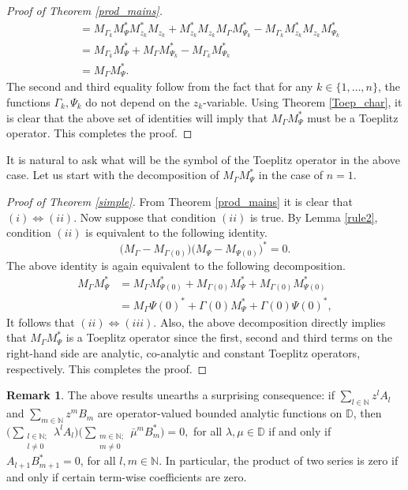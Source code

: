 \documentclass[12pt]{amsart}
\theoremstyle{definition}
\newtheorem{rem}{Remark}[section]
\newcommand{\Nat}{\mathbb{N}}
\newcommand{\D}{\mathbb{D}}
\newcommand{\1}{{\mbox{\bf 1}}}
\begin{document}
\begin{proof}[Proof of Theorem \ref{prod_mains}]
\begin{align*}
&= M_{\Gamma_k} M_{\Psi}^* M_{z_k}^* M_{z_k} + M_{z_k}^* M_{z_k} M_{\Gamma} M_{\Psi_k}^* - M_{\Gamma_k} M_{z_k}^* M_{z_k} M_{\Psi_k}^* \\
&= M_{\Gamma_k} M_{\Psi}^* + M_{\Gamma} M_{\Psi_k}^* - M_{\Gamma_k} M_{\Psi_k}^*\\
&= M_{\Gamma} M_{\Psi}^*.
\end{align*}
The second and third equality follow from the fact that for any $k \in \{1,\ldots,n\}$, the functions $\Gamma_k, \Psi_k$ do not depend on the $z_k$-variable. Using Theorem \ref{Toep_char}, it is clear that the above set of identities will imply that $M_{\Gamma} M_{\Psi}^*$ must be a Toeplitz operator. This completes the proof.
\end{proof}
It is natural to ask what will be the symbol of the Toeplitz operator in the above case.  Let us start with the decomposition of $M_{\Gamma}M_{\Psi}^*$ in the case of $n=1$.
\begin{proof}[Proof of Theorem \ref{simple}]
From Theorem \ref{prod_mains} it is clear that $(i) \iff (ii)$.  Now suppose that condition $(ii)$ is true. By Lemma \ref{rule2}, condition $(ii)$ is equivalent to the following identity. 
\[
\big( M_{\Gamma} - M_{\Gamma(0)}\big) \big( M_{\Psi} - M_{\Psi(0)}\big)^* = 0.
\]
The above identity is again equivalent to the following decomposition.
\begin{align*}
M_{\Gamma} M_{\Psi}^* &=  M_{\Gamma}M_{\Psi(0)}^* + M_{\Gamma(0)}M_{\Psi}^* + M_{\Gamma(0)}M_{\Psi(0)}^*\\
&= M_{\Gamma} \Psi(0)^* + \Gamma(0) M_{\Psi}^* + \Gamma(0) \Psi(0)^*,
\end{align*}
It follows that $(ii) \iff (iii)$.  Also, the above decomposition directly implies that $M_{\Gamma} M_{\Psi}^*$ is a Toeplitz operator since the first, second and third terms on the right-hand side are analytic, co-analytic and constant Toeplitz operators, respectively.  This completes the proof.
\end{proof}
\begin{rem}\label{interes}
The above results unearths a surprising consequence: \textsf{if $\underset{l \in \Nat}{\sum} z^l A_{l}$ and $\underset{m \in \Nat}{\sum} z^m B_{m}$ are operator-valued bounded analytic functions on $\D$, then 
$
\big(\underset{\substack{l \in \Nat; \\ l \neq 0}}{\sum} {\lambda}^l A_{l} \big) \big(\underset{\substack{m \in \Nat; \\ m \neq 0}}{\sum} \bar{\mu}^m B_{m}^* \big) = 0,
$
for all $\lambda, \mu \in \D$ if and only if $A_{l+1} B_{m+1}^* = 0$, for all $l,m \in \Nat$.
}
In particular, the product of two series is zero if and only if certain term-wise coefficients are zero.
\end{rem}
\end{document}
